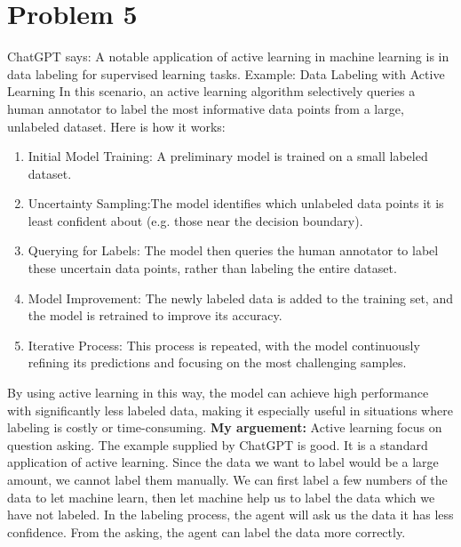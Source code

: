 \documentclass[12pt,a4paper]{article}
\begin{document}
\section*{Problem 5}
ChatGPT says:
\newline
A notable application of active learning in machine learning is in data labeling for supervised learning tasks.
\newline
Example: Data Labeling with Active Learning
\newline
In this scenario, an active learning algorithm selectively queries a human annotator to label the most informative data points from a large, unlabeled dataset. Here is how it works:
\begin{enumerate}
    \item Initial Model Training: A preliminary model is trained on a small labeled dataset.
    \item Uncertainty Sampling:The model identifies which unlabeled data points it is least confident about (e.g. those near the decision boundary). 
    \item Querying for Labels: The model then queries the human annotator to label these uncertain data points, rather than labeling the entire dataset.
    \item Model Improvement: The newly labeled data is added to the training set, and the model is retrained to improve its accuracy.
    \item Iterative Process: This process is repeated, with the model continuously refining its predictions and focusing on the most challenging samples.
\end{enumerate}
By using active learning in this way, the model can achieve high performance with significantly less labeled data, making it especially useful in situations where labeling is costly or time-consuming.
\newline
\hspace*{\fill}
\newline
\textbf{My arguement:}
\newline
Active learning focus on question asking. The example supplied by ChatGPT is good.
It is a standard application of active learning. Since the data we want to label would be a large amount,
we cannot label them manually. We can first label a few numbers of the data to let machine learn, 
then let machine help us to label the data which we have not labeled. In the labeling process, the agent will ask us
the data it has less confidence. From the asking, the agent can label the data more correctly.
\end{document}
